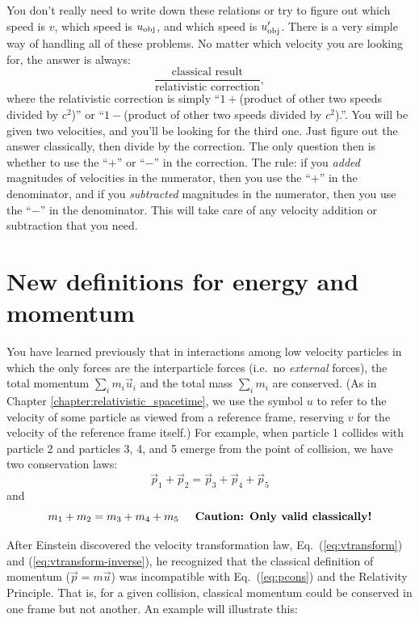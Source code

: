 You don't really need to write down these relations or try to figure
out which speed is $v$, which speed is $u_{\rm obj}$, and which speed
is $u_{\rm obj}^\prime$.  There is a very simple way of handling all
of these problems.  No matter which velocity you are looking for, the
answer is always:
\begin{equation}
\frac{\text{classical result}}{\text{relativistic correction}}, \nonumber 
\end{equation}
where the relativistic correction is simply ``$1+$(product of other two
speeds divided by $c^2$)'' or ``$1-$(product of other two speeds divided
by $c^2$).''.  You will be given two velocities, and you'll be looking
for the third one.  Just figure out the answer classically, then divide
by the correction.  The only question then is whether to use the ``$+$''
or ``$-$'' in the correction.  The rule: if you {\em added} magnitudes of
velocities in the numerator, then you use the ``$+$'' in the denominator,
and if you {\em subtracted} magnitudes in the numerator, then you use the
``$-$'' in the denominator.  This will take care of any velocity addition
or subtraction that you need.

\section{New definitions for energy and momentum}

You have learned previously that in interactions among low velocity
particles in which the only forces are the interparticle forces
(i.e.\ no {\em external} forces), the total momentum $\sum_i
m_i\vec{u}_i$ and the total mass $\sum_i m_i$ are conserved.  (As in
Chapter \ref{chapter:relativistic_spacetime}, we use the symbol $u$ to
refer to the velocity of some particle as viewed from a reference
frame, reserving $v$ for the velocity of the reference frame itself.)
For example, when particle 1 collides with particle 2 and particles 3,
4, and 5 emerge from the point of collision, we have two conservation
laws:
\begin{equation}
\vec{p}_1 +\vec{p}_2 = \vec{p}_3 +\vec{p}_4 +\vec{p}_5
\label{eq:pcons}
\end{equation}
and
\begin{equation}
m_1 + m_2 = m_3 + m_4 + m_5 
   \text{\hspace{0.2in}{\bf Caution: Only valid classically!}}
\label{eq:mcons}
\end{equation}

After Einstein discovered the velocity transformation law,
Eq.~(\ref{eq:vtransform}) and (\ref{eq:vtransform-inverse}), he
recognized that the classical definition of momentum ($\vec{p} =
m\vec{u}$) was incompatible with Eq.~(\ref{eq:pcons}) and the Relativity
Principle.  That is, for a given collision, classical momentum could
be conserved in one frame but not another.  An example will illustrate
this:


